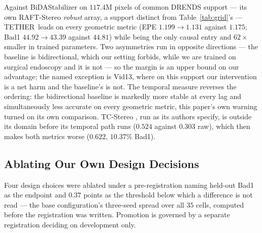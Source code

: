 \documentclass[letterpaper,10pt,conference]{ieeeconf}
\newcommand{\steer}{TETHER}
\begin{document}
Against BiDAStabilizer \cite{jing2024bida} on $117.4$M pixels of common
DRENDS support --- its own RAFT-Stereo \emph{robust} array, a support
distinct from Table~\ref{tab:grid}'s --- \steer\ leads on every geometric
metric (EPE $1.199\to\mathbf{1.131}$ against $1.175$; Bad1
$44.92\to\mathbf{43.39}$ against $44.81$) while being the only causal entry
and $62\times$ smaller in trained parameters. Two asymmetries run in
opposite directions --- the baseline is bidirectional, which our setting
forbids, while we are trained on surgical endoscopy and it is not --- so the
margin is an upper bound on our advantage; the named exception is Vid13,
where on this support our intervention is a net harm and the baseline's is
not. The temporal measure reverses the ordering: the bidirectional baseline
is markedly more stable at every lag and simultaneously less accurate on
every geometric metric, this paper's own warning turned on its own
comparison. TC-Stereo \cite{zeng2024tcstereo}, run as its authors specify, is outside its
domain before its temporal path runs ($0.524$ against $0.303$ raw), which then
makes both metrics worse ($0.622$, $10.37\%$ Bad1).

\subsection{Ablating Our Own Design Decisions}
\label{sec:ablations}

Four design choices were ablated under a pre-registration naming held-out Bad1
as the endpoint and $0.37$ points as the threshold below which a difference is
not read --- the base configuration's three-seed spread over all $35$ cells,
computed before the registration was written. Promotion is governed by a
separate registration deciding on development only.
\end{document}
